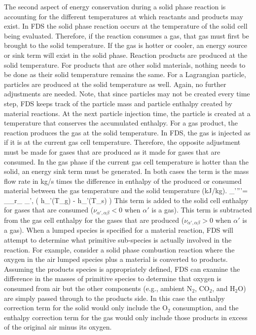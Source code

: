 The second aspect of energy conservation during a solid phase reaction is accounting for the different temperatures at which reactants and products may exist. In FDS the solid phase reaction occurs at the temperature of the solid cell being evaluated. Therefore, if the reaction consumes a gas, that gas must first be brought to the solid temperature. If the gas is hotter or cooler, an energy source or sink term will exist in the solid phase. Reaction products are produced at the solid temperature. For products that are other solid materials, nothing needs to be done as their solid temperature remains the same. For a Lagrangian particle, particles are produced at the solid temperature as well. Again, no further adjustments are needed. Note, that since particles may not be created every time step, FDS keeps track of the particle mass and particle enthalpy created by material reactions. At the next particle injection time, the particle is created at a temperature that conserves the accumulated enthalpy. For a gas product, the reaction produces the gas at the solid temperature. In FDS, the gas is injected as if it is at the current gas cell temperature. Therefore, the opposite adjustment must be made for gases that are produced as it made for gases that are consumed. In the gas phase if the current gas cell temperature is hotter than the solid, an energy sink term must be generated. In both cases the term is the mass flow rate in kg/s times the difference in enthalpy of the produced or consumed material between the gas temperature and the solid temperature (kJ/kg).
\be
{}_{\alpha'}'''= \sum_\alpha \sum_\beta r_{\alpha \beta}  \nu_{\alpha',\alpha \beta} \left( h_{\alpha'}(T_{\rm g}) - h_{\alpha'}(T_{\rm s}) \right)
\ee
This term is added to the solid cell enthalpy for gases that are consumed ($\nu_{\alpha',\alpha \beta}<0$ when $\alpha'$ is a gas). This term is subtracted from the gas cell enthalpy for the gases that are produced ($\nu_{\alpha',\alpha \beta}>0$ when $\alpha'$ is a gas). When a lumped species is specified for a material reaction, FDS will attempt to determine what primitive sub-species is actually involved in the reaction. For example, consider a solid phase combustion reaction where the oxygen in the air lumped species plus a material is converted to products. Assuming the products species is appropriately defined, FDS can examine the difference in the masses of primitive species to determine that oxygen is consumed from air but the other components (e.g., ambient N$_2$, CO$_2$, and H$_2$O) are simply passed through to the products side. In this case the enthalpy correction term for the solid would only include the O$_2$ consumption, and the enthalpy correction term for the gas would only include those products in excess of the original air minus its oxygen.




